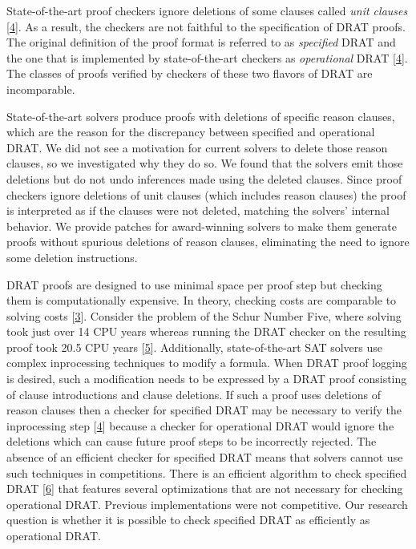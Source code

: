 \documentclass[
]{report}
\begin{document}
State-of-the-art proof checkers ignore deletions of some clauses called
\emph{unit clauses}
{[}\protect\hyperlink{ref-DBLP:confux2fsatux2fRebola-PardoB18}{4}{]}. As
a result, the checkers are not faithful to the specification of DRAT
proofs. The original definition of the proof format is referred to as
\emph{specified} DRAT and the one that is implemented by
state-of-the-art checkers as \emph{operational} DRAT
{[}\protect\hyperlink{ref-DBLP:confux2fsatux2fRebola-PardoB18}{4}{]}.
The classes of proofs verified by checkers of these two flavors of DRAT
are incomparable.

State-of-the-art solvers produce proofs with deletions of specific
reason clauses, which are the reason for the discrepancy between
specified and operational DRAT. We did not see a motivation for current
solvers to delete those reason clauses, so we investigated why they do
so. We found that the solvers emit those deletions but do not undo
inferences made using the deleted clauses. Since proof checkers ignore
deletions of unit clauses (which includes reason clauses) the proof is
interpreted as if the clauses were not deleted, matching the solvers'
internal behavior. We provide patches for award-winning solvers to make
them generate proofs without spurious deletions of reason clauses,
eliminating the need to ignore some deletion instructions.

DRAT proofs are designed to use minimal space per proof step but
checking them is computationally expensive. In theory, checking costs
are comparable to solving costs
{[}\protect\hyperlink{ref-DBLP:journalsux2fstvrux2fHeuleHW14}{3}{]}.
Consider the problem of the Schur Number Five, where solving took just
over 14 CPU years whereas running the DRAT checker on the resulting
proof took 20.5 CPU years
{[}\protect\hyperlink{ref-DBLP:confux2faaaiux2fHeule18}{5}{]}.
Additionally, state-of-the-art SAT solvers use complex inprocessing
techniques to modify a formula. When DRAT proof logging is desired, such
a modification needs to be expressed by a DRAT proof consisting of
clause introductions and clause deletions. If such a proof uses
deletions of reason clauses then a checker for specified DRAT may be
necessary to verify the inprocessing step
{[}\protect\hyperlink{ref-DBLP:confux2fsatux2fRebola-PardoB18}{4}{]}
because a checker for operational DRAT would ignore the deletions which
can cause future proof steps to be incorrectly rejected. The absence of
an efficient checker for specified DRAT means that solvers cannot use
such techniques in competitions. There is an efficient algorithm to
check specified DRAT
{[}\protect\hyperlink{ref-DBLP:confux2ffmcadux2fRebola-PardoC18}{6}{]}
that features several optimizations that are not necessary for checking
operational DRAT. Previous implementations were not competitive. Our
research question is whether it is possible to check specified DRAT as
efficiently as operational DRAT.
\end{document}
